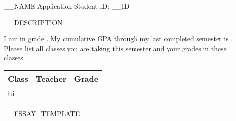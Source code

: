 \begin{center}
  {\LARGE __NAME Application}
  Student ID: __ID
\end{center}
__DESCRIPTION
\begin{questions}
  \question I am in grade \fillin.
  \question My cumulative GPA through my last completed semester is \fillin.
  \question Please list all classes you are taking this semester and your grades in those classes. \\
  \begin{tabularx}{.9\textwidth}{X|X|r}
    Class & Teacher & Grade \\ \hline
    \parbox[][2in]{0pt}{hi} & & \\
  \end{tabularx}
  __ESSAY_TEMPLATE
  
  \thispagestyle{empty} %
\end{questions}
\pagebreak